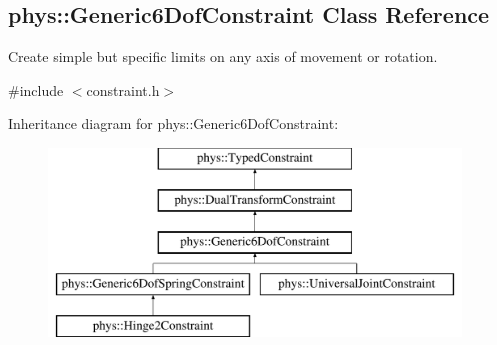 \hypertarget{classphys_1_1Generic6DofConstraint}{
\subsection{phys::Generic6DofConstraint Class Reference}
\label{classphys_1_1Generic6DofConstraint}
}


Create simple but specific limits on any axis of movement or rotation.  




{\ttfamily \#include $<$constraint.h$>$}

Inheritance diagram for phys::Generic6DofConstraint:\begin{figure}[H]
\begin{center}
\leavevmode
\includegraphics[height=5.000000cm]{classphys_1_1Generic6DofConstraint}
\end{center}
\end{figure}
